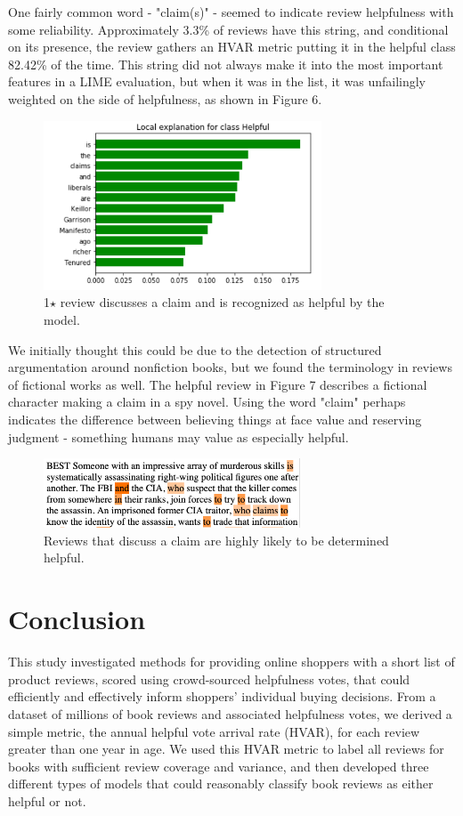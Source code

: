 \documentclass[10pt, a4paper, twocolumn]{article}
\begin{document}
One fairly common word - "claim(s)" - seemed to indicate review helpfulness with some reliability. Approximately 3.3\% of reviews have this string, and conditional on its presence, the review gathers an HVAR metric putting it in the helpful class 82.42\% of the time. This string did not always make it into the most important features in a LIME evaluation, but when it was in the list, it was unfailingly weighted on the side of helpfulness, as shown in Figure 6.

\begin{figure}[ht]
\includegraphics[width=3.25in]{LIME_claims_as_helpfulness_indicator.png}
\caption{1$\star$ review discusses a claim and is recognized as helpful by the model.}
\end{figure}

We initially thought this could be due to the detection of structured argumentation\cite{Lippi2016292} around nonfiction books, but we found the terminology in reviews of fictional works as well. The helpful review in Figure 7 describes a fictional character making a claim in a spy novel. Using the word "claim" perhaps indicates the difference between believing things at face value and reserving judgment - something humans may value as especially helpful.

\begin{figure}[ht]
\includegraphics[width=3in]{LIME_fictional_review_character_claim.png}
\caption{Reviews that discuss a claim are highly likely to be determined helpful.}
\end{figure}


\section{Conclusion}
This study investigated methods for providing online shoppers with a short list of product reviews, scored using crowd-sourced helpfulness votes, that could efficiently and effectively inform shoppers’ individual buying decisions. From a dataset of millions of book reviews and associated helpfulness votes, we derived a simple metric, the annual helpful vote arrival rate (HVAR), for each review greater than one year in age.  We used this HVAR metric to label all reviews for books with sufficient review coverage and variance, and then developed three different types of models that could reasonably classify book reviews as either helpful or not.
\end{document}
